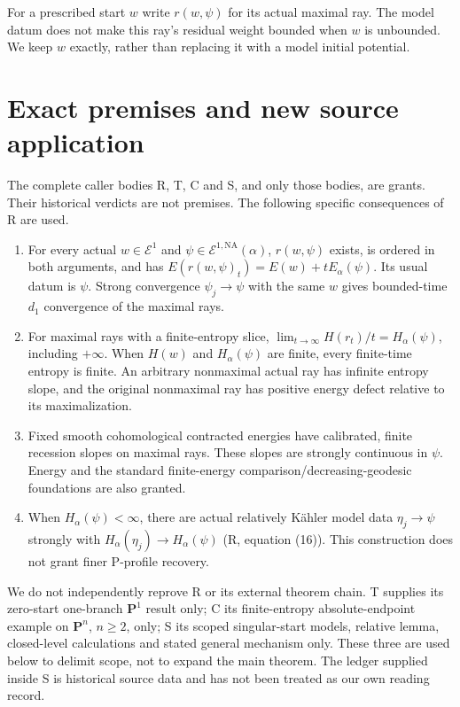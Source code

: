 \documentclass[11pt]{article}
\newcommand{\NA}{\mathrm{NA}}
\begin{document}
For a prescribed start $w$ write $r(w,\psi)$ for its actual maximal
ray. The model datum does not make this ray's residual weight bounded
when $w$ is unbounded. We keep $w$ exactly, rather than replacing it
with a model initial potential.

\section{Exact premises and new source application}
The complete caller bodies R, T, C and S, and only those bodies, are
grants. Their historical verdicts are not premises. The following
specific consequences of R are used.
\begin{enumerate}
\item For every actual $w\in\mathcal E^1$ and
$\psi\in\mathcal E^{1,\NA}(\alpha)$, $r(w,\psi)$ exists, is ordered
in both arguments, and has
$E(r(w,\psi)_t)=E(w)+tE_\alpha(\psi)$. Its usual datum is $\psi$.
Strong convergence $\psi_j\to\psi$ with the same $w$ gives bounded-time
$d_1$ convergence of the maximal rays.
\item For maximal rays with a finite-entropy slice,
$\lim_{t\to\infty}H(r_t)/t=H_\alpha(\psi)$, including $+\infty$.
When $H(w)$ and $H_\alpha(\psi)$ are finite, every finite-time
entropy is finite. An arbitrary nonmaximal actual ray has infinite
entropy slope, and the original nonmaximal ray has positive energy defect relative to its
maximalization.
\item Fixed smooth cohomological contracted energies have calibrated,
finite recession slopes on maximal rays. These slopes are strongly
continuous in $\psi$. Energy and the standard finite-energy
comparison/decreasing-geodesic foundations are also granted.
\item When $H_\alpha(\psi)<\infty$, there are actual relatively
K\"ahler model data $\eta_j\to\psi$ strongly with
$H_\alpha(\eta_j)\to H_\alpha(\psi)$ (R, equation (16)).
This construction does not grant finer P-profile recovery.
\end{enumerate}
We do not independently reprove R or its external theorem chain.
T supplies its zero-start one-branch $\mathbf P^1$ result only;
C its finite-entropy absolute-endpoint example on $\mathbf P^n$,
$n\ge2$, only; S its scoped singular-start models, relative lemma,
closed-level calculations and stated general mechanism only. These
three are used below to delimit scope, not to expand the main theorem.
The ledger supplied inside S is historical source data and has not
been treated as our own reading record.
\end{document}
